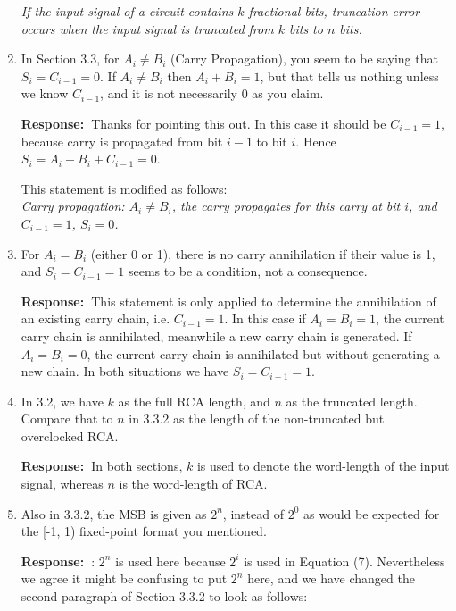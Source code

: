 \documentclass[a4paper, 11pt]{article}
\def\Response{\noindent \textbf{Response:~}}
\newcommand{\Question}[1]{\textcolor[rgb]{0.51,0.00,0.00}{#1}}
\newcommand{\PaperText}[1]{\emph{#1}}
\begin{document}
\begin{enumerate}
      \PaperText{If the input signal of a circuit contains $k$ fractional bits, truncation error occurs when the input signal is truncated from $k$ bits to $n$ bits.}\\
      
  \item \Question{In Section 3.3, for $A_i\neq B_i$ (Carry Propagation), you seem to be saying that $S_i = C_{i-1} = 0$.  If $A_i \neq B_i$ then $A_i + B_i = 1$, but that tells us nothing unless we know $C_{i-1}$, and it is not necessarily 0 as you claim.}
      
      \Response Thanks for pointing this out. In this case it should be $C_{i-1} =1$, because carry is propagated from bit $i-1$ to bit $i$. Hence $S_i=A_i+B_i+C_{i-1}=0$.
      
      This statement is modified as follows:\\
      
      \PaperText{Carry propagation: $A_i\neq B_i$, the carry propagates for this carry at bit $i$, and $C_{i-1}=1$, $S_i=0$.}\\
      
  \item \Question{For $A_i = B_i$ (either 0 or 1), there is no carry annihilation if their value is 1, and $S_i = C_{i-1} = 1$ seems to be a condition, not a consequence.}
      
      \Response This statement is only applied to determine the annihilation of an existing carry chain, i.e. $C_{i-1}=1$. In this case if $A_i=B_i=1$, the current carry chain is annihilated, meanwhile a new carry chain is generated. If $A_i=B_i=0$, the current carry chain is annihilated but without generating a new chain. In both situations we have $S_i=C_{i-1}=1$.

  \item \Question{In 3.2, we have $k$ as the full RCA length, and $n$ as the truncated length.  Compare that to $n$ in 3.3.2 as the length of the non-truncated but overclocked RCA.}
      
      \Response In both sections, $k$ is used to denote the word-length of the input signal, whereas $n$ is the word-length of RCA.
      
  \item \Question{Also in 3.3.2, the MSB is given as $2^n$, instead of $2^0$ as would be expected for the [-1, 1) fixed-point format you mentioned.}
      
      \Response : $2^n$ is used here because $2^i$ is used in Equation (7). Nevertheless we agree it might be confusing to put $2^n$ here, and we have changed the second paragraph of Section 3.3.2 to look as follows:\\
      

\end{enumerate}
\end{document}
